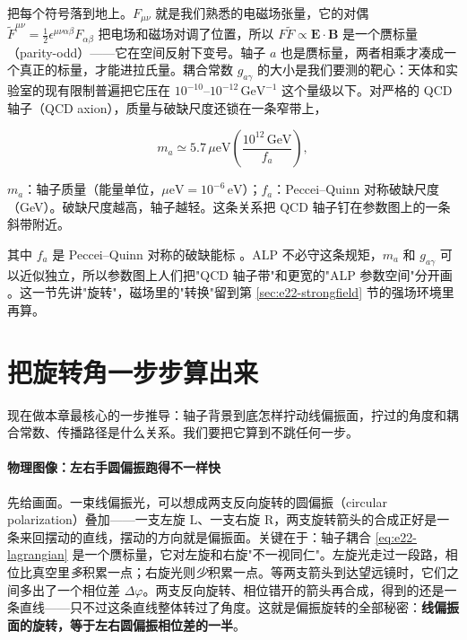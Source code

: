 把每个符号落到地上。\(F_{\mu\nu}\) 就是我们熟悉的电磁场张量，它的对偶 \(\tilde F^{\mu\nu}=\tfrac12\epsilon^{\mu\nu\alpha\beta}F_{\alpha\beta}\) 把电场和磁场对调了位置，所以 \(F\tilde F\propto \bm E\cdot\bm B\) 是一个赝标量（parity-odd）——它在空间反射下变号。轴子 \(a\) 也是赝标量，两者相乘才凑成一个真正的标量，才能进拉氏量。耦合常数 \(g_{a\gamma}\) 的大小是我们要测的靶心：天体和实验室的现有限制普遍把它压在 \(10^{-10}\text{--}10^{-12}\,\mathrm{GeV^{-1}}\) 这个量级以下。对严格的 QCD 轴子（QCD axion），质量与破缺尺度还锁在一条窄带上，

\begin{equation}
  m_a \simeq 5.7\,\mu\mathrm{eV}\left(\frac{10^{12}\,\mathrm{GeV}}{f_a}\right),
  \label{eq:e22-qcd-mass}
\end{equation}
\begin{formulaexplain}
\(m_a\)：轴子质量（能量单位，\(\mu\mathrm{eV}=10^{-6}\,\mathrm{eV}\)）；\(f_a\)：Peccei--Quinn 对称破缺尺度（GeV）。破缺尺度越高，轴子越轻。这条关系把 QCD 轴子钉在参数图上的一条斜带附近。
\end{formulaexplain}

其中 \(f_a\) 是 Peccei--Quinn 对称的破缺能标 \citep{1977PhRvL..38.1440P,1978PhRvL..40..223W,1978PhRvL..40..279W}。ALP 不必守这条规矩，\(m_a\) 和 \(g_{a\gamma}\) 可以近似独立，所以参数图上人们把"QCD 轴子带"和更宽的"ALP 参数空间"分开画 \citep{2016PhR...643....1M,2014JHEP...06..037D,1983PhRvL..51.1415S}。这一节先讲"旋转"，磁场里的"转换"留到第 \ref{sec:e22-strongfield} 节的强场环境里再算。


\section{把旋转角一步步算出来}
\label{sec:e22-rotation}

现在做本章最核心的一步推导：轴子背景到底怎样拧动线偏振面，拧过的角度和耦合常数、传播路径是什么关系。我们要把它算到不跳任何一步。

\paragraph{物理图像：左右手圆偏振跑得不一样快}

先给画面。一束线偏振光，可以想成两支反向旋转的圆偏振（circular polarization）叠加——一支左旋 \(\mathrm L\)、一支右旋 \(\mathrm R\)，两支旋转箭头的合成正好是一条来回摆动的直线，摆动的方向就是偏振面。关键在于：轴子耦合 \eqref{eq:e22-lagrangian} 是一个赝标量，它对左旋和右旋"不一视同仁"。左旋光走过一段路，相位比真空里\emph{多}积累一点；右旋光则\emph{少}积累一点。等两支箭头到达望远镜时，它们之间多出了一个相位差 \(\Delta\varphi\)。两支反向旋转、相位错开的箭头再合成，得到的还是一条直线——只不过这条直线整体转过了角度。这就是偏振旋转的全部秘密：\textbf{线偏振面的旋转，等于左右圆偏振相位差的一半}。

